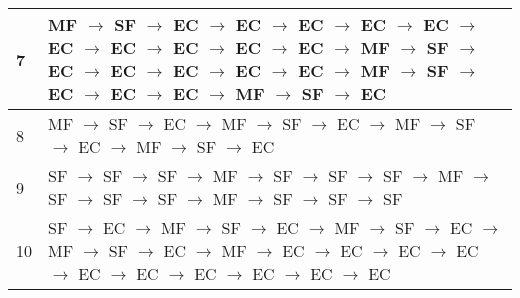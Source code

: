 \begin{table}[h]
\begin{tabular}{|m{}|m{}|}
\hline 
 \hfil 7 & MF $\rightarrow$ SF $\rightarrow$ EC $\rightarrow$ EC $\rightarrow$ EC $\rightarrow$ EC $\rightarrow$ EC $\rightarrow$ EC $\rightarrow$ EC $\rightarrow$ EC $\rightarrow$ EC $\rightarrow$ EC $\rightarrow$ MF $\rightarrow$ SF $\rightarrow$ EC $\rightarrow$ EC $\rightarrow$ EC $\rightarrow$ EC $\rightarrow$ EC $\rightarrow$ MF $\rightarrow$ SF $\rightarrow$ EC $\rightarrow$ EC $\rightarrow$ EC $\rightarrow$ MF $\rightarrow$ SF $\rightarrow$ EC \\
 \hline
 \hfil 8 & MF $\rightarrow$ SF $\rightarrow$ EC $\rightarrow$ MF $\rightarrow$ SF $\rightarrow$ EC $\rightarrow$ MF $\rightarrow$ SF $\rightarrow$ EC $\rightarrow$ MF $\rightarrow$ SF $\rightarrow$ EC \\
 \hline
 \hfil 9 & SF $\rightarrow$ SF $\rightarrow$ SF $\rightarrow$ MF $\rightarrow$ SF $\rightarrow$ SF $\rightarrow$ SF $\rightarrow$ MF $\rightarrow$ SF $\rightarrow$ SF $\rightarrow$ SF $\rightarrow$ MF $\rightarrow$ SF $\rightarrow$ SF $\rightarrow$ SF \\
 \hline
 \hfil 10 & SF $\rightarrow$ EC $\rightarrow$ MF $\rightarrow$ SF $\rightarrow$ EC $\rightarrow$ MF $\rightarrow$ SF $\rightarrow$ EC $\rightarrow$ MF $\rightarrow$ SF $\rightarrow$ EC $\rightarrow$ MF $\rightarrow$ EC $\rightarrow$ EC $\rightarrow$ EC $\rightarrow$ EC $\rightarrow$ EC $\rightarrow$ EC $\rightarrow$ EC $\rightarrow$ EC $\rightarrow$ EC $\rightarrow$ EC \\
 \hline
\end{tabular}

\end{table}
